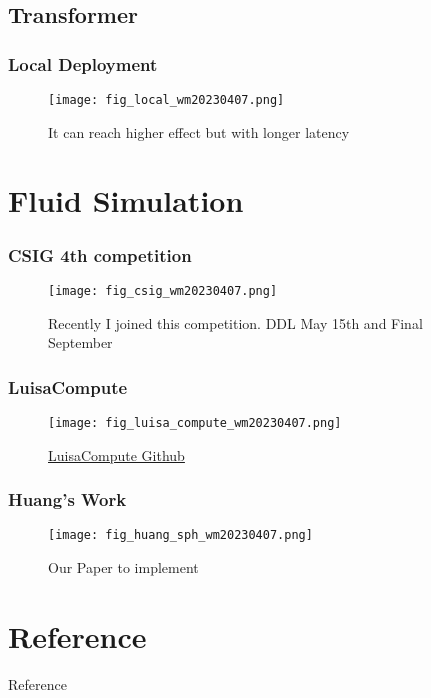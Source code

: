 \documentclass[10pt, hyperref={colorlinks=true,linkcolor=blue},xcolor=dvipsnames]{beamer}
\begin{document}
\subsection{Transformer}



\begin{frame}
    \frametitle{Local Deployment}
    \begin{figure}
        \texttt{[image: fig\_local\_wm20230407.png]}
        \caption[short]{It can reach higher effect but with longer latency}
    \end{figure}
\end{frame}


\section{Fluid Simulation}

\begin{frame}
    \frametitle{CSIG 4th competition}
    \begin{figure}
        \texttt{[image: fig\_csig\_wm20230407.png]}
        \caption[short]{Recently I joined this competition. DDL May 15th and Final September}
    \end{figure}
\end{frame}



\begin{frame}
    \frametitle{LuisaCompute}
    \begin{figure}
        \texttt{[image: fig\_luisa\_compute\_wm20230407.png]}
        \caption[short]{\href{https://github.com/LuisaGroup/LuisaCompute}{LuisaCompute Github\cite{zhengLuisaRenderHighPerformanceRendering2022}}}
    \end{figure}
\end{frame}
\begin{frame}
    \frametitle{Huang's Work}
    \begin{figure}
        \texttt{[image: fig\_huang\_sph\_wm20230407.png]}
        \caption[short]{Our Paper to implement\cite{huangGeneralNovelParallel2019}}
    \end{figure}
\end{frame}

\section{Reference}

\begin{frame}[allowframebreaks]{Reference}
    
    
\end{frame}
\end{document}
